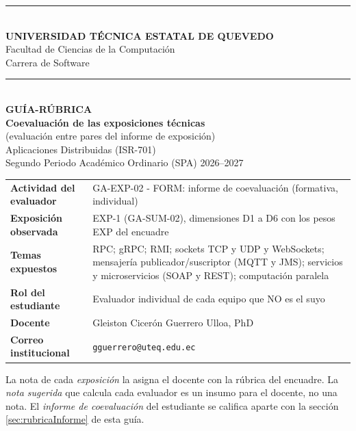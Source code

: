 \documentclass[11pt,a4paper]{article}
\begin{document}
\begin{titlepage}
	\centering
	\vspace*{0.4cm}
	{\color{uteqBlue}\rule{\linewidth}{1.2pt}}\\[0.4cm]
	{\Large\bfseries\color{uteqBlue} UNIVERSIDAD TÉCNICA ESTATAL DE QUEVEDO}\\[0.25cm]
	{\large Facultad de Ciencias de la Computación}\\[0.1cm]
	{\large Carrera de Software}\\[0.4cm]
	{\color{uteqBlue}\rule{\linewidth}{1.2pt}}\\[1.4cm]
	{\Huge\bfseries\color{uteqBlue} GUÍA-RÚBRICA}\\[0.4cm]
	{\LARGE\bfseries Coevaluación de las exposiciones técnicas}\\[0.25cm]
	{\large (evaluación entre pares del informe de exposición)}\\[0.5cm]
	{\Large Aplicaciones Distribuidas (ISR-701)}\\[0.2cm]
	{\large Segundo Periodo Académico Ordinario (SPA) 2026--2027}\\[1.2cm]
	\begin{tcolorbox}[enhanced,colback=uteqSoft,colframe=uteqBlue,boxrule=0.8pt,arc=3pt,width=0.9\linewidth,left=8pt,right=8pt]
		\small
		\begin{tabularx}{\linewidth}{@{}L{4.4cm}Y@{}}
			\textbf{Actividad del evaluador} & GA-EXP-02 - FORM: informe de coevaluación (formativa, individual) \\
			\textbf{Exposición observada} & EXP-1 (GA-SUM-02), dimensiones D1 a D6 con los pesos EXP del encuadre \\
			\textbf{Temas expuestos} & RPC; gRPC; RMI; sockets TCP y UDP y WebSockets; mensajería publicador/suscriptor (MQTT y JMS); servicios y microservicios (SOAP y REST); computación paralela \\
			\textbf{Rol del estudiante} & Evaluador individual de cada equipo que NO es el suyo \\
			\textbf{Docente} & Gleiston Cicerón Guerrero Ulloa, PhD \\
			\textbf{Correo institucional} & \texttt{gguerrero@uteq.edu.ec} \\
		\end{tabularx}
	\end{tcolorbox}
	\vfill
	{\small\color{uteqBlue} La nota de cada \emph{exposición} la asigna el docente con la rúbrica del encuadre. La \emph{nota sugerida} que calcula cada evaluador es un insumo para el docente, no una nota. El \emph{informe de coevaluación} del estudiante se califica aparte con la sección \ref{sec:rubricaInforme} de esta guía.}
\end{titlepage}
\end{document}
